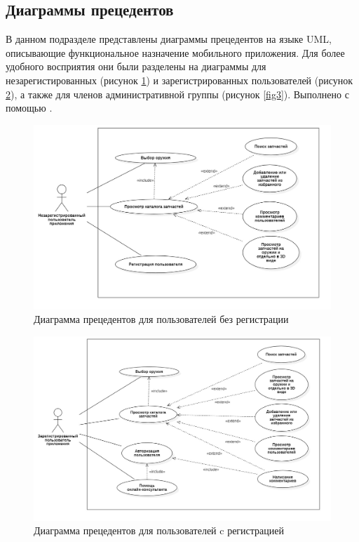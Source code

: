 \documentclass[14pt]{extreport}
\begin{document}
\subsection{Диаграммы прецедентов}

В данном подразделе представлены диаграммы прецедентов на языке UML, описывающие функциональное назначение мобильного приложения. Для более удобного восприятия они были разделены на диаграммы для незарегистированных (рисунок \ref{fig1}) и зарегистрированных пользователей (рисунок \ref{fig2}), а также для членов административной группы (рисунок \ref{fig3}). Выполнено с помощью \cite{bib4}.

\begin{figure}[H]
\centerline{\includegraphics[width=1\linewidth]{nereg}}
\caption{Диаграмма прецедентов для пользователей без регистрации}
\label{fig1}
\end{figure}

\begin{figure}[H]
\centerline{\includegraphics[width=1\linewidth]{reg}}
\caption{Диаграмма прецедентов для пользователей c регистрацией}
\label{fig2}
\end{figure}
\end{document}
